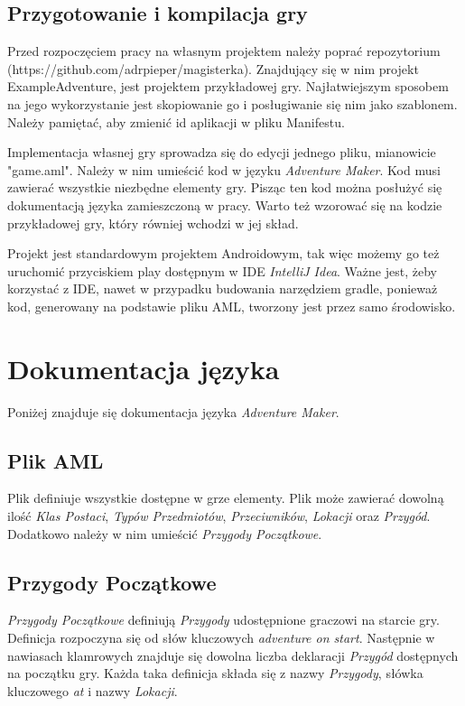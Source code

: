 \documentclass[openright]{xmgr}
\begin{document}
\section{Przygotowanie i kompilacja gry}
Przed rozpoczęciem pracy na własnym projektem należy poprać repozytorium (https://github.com/adrpieper/magisterka). Znajdujący się w nim projekt ExampleAdventure, jest projektem przykładowej gry. Najłatwiejszym sposobem na jego wykorzystanie jest skopiowanie go i posługiwanie się nim jako szablonem. Należy pamiętać, aby zmienić id aplikacji w pliku Manifestu.

Implementacja własnej gry sprowadza się do edycji jednego pliku, mianowicie "game.aml". Należy w nim umieścić kod w języku \textit{Adventure Maker}. Kod musi  zawierać wszystkie niezbędne elementy gry. Pisząc ten kod można posłużyć się dokumentacją języka zamieszczoną w pracy. Warto też wzorować się na kodzie przykładowej gry, który równiej wchodzi w jej skład.

Projekt jest standardowym projektem Androidowym, tak więc możemy go też uruchomić przyciskiem play dostępnym w IDE \textit{IntelliJ Idea}. Ważne jest, żeby korzystać z IDE, nawet w przypadku budowania narzędziem gradle, ponieważ kod, generowany na podstawie pliku AML, tworzony jest przez samo środowisko.

\chapter{Dokumentacja języka} 
Poniżej znajduje się dokumentacja języka \textit{Adventure Maker}.

\section{Plik AML} 
Plik definiuje wszystkie dostępne w grze elementy. Plik może zawierać dowolną ilość \textit{Klas Postaci}, \textit{Typów Przedmiotów}, \textit{Przeciwników}, \textit{Lokacji} oraz \textit{Przygód}. Dodatkowo należy w nim umieścić \textit{Przygody Początkowe}. 

\section{Przygody Początkowe} 
\textit{Przygody Początkowe} definiują \textit{Przygody} udostępnione graczowi na starcie gry. Definicja rozpoczyna się od słów kluczowych \textit{adventure on start}. Następnie w nawiasach klamrowych znajduje się dowolna liczba deklaracji \textit{Przygód} dostępnych na początku gry.
Każda taka definicja składa się z nazwy \textit{Przygody}, słówka kluczowego \textit{at} i nazwy \textit{Lokacji}.
\end{document}
